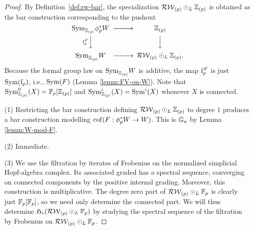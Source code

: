 \begin{proof}
By Definition~\ref{def:rw-bar}, the specialization $\mathcal{RW}_{(p)} \odot_L \mathbb{Z}_{(p)}$ is obtained as the bar construction corresponding to the pushout
\begin{equation*}
\begin{CD}
\Sym_{\Z_{(p)}} \phi_p^* W @>>> \Z_{(p)} \\
  @V\frob_p^FVV        @VVV \\
\Sym_{\Z_{(p)}} W @>>> \dRW_{(p)} \hotimes_L \Z_{(p)}.
\end{CD}
\end{equation*}
Because the formal group law on $\mathrm{Sym}_{\mathbb{Z}_{(p)}} W$ is additive, the map $\mathrm f_p^F$ is just $\mathrm{Sym}(\mathrm f_p)$, i.e., $\mathrm{Sym}(F)$ (Lemma \ref{lemm:FV-on-W}).
Note that $\mathrm{Sym}^0_{\mathbb{Z}_{(p)}}(X) = \mathbb{F}_p[\mathbb{Z}_{(p)}]$ and $\mathrm{Sym}^i_{\mathbb{Z}_{(p)}}(X) = \mathrm{Sym}^i(X)$ whenever $X$ is connected.

(1) Restricting the bar construction defining $\mathcal{RW}_{(p)} \odot_L \mathbb{Z}_{(p)}$ to degree $1$ produces a bar construction modelling $\operatorname{cof}(F: \phi_p^* W \to W)$.
This is ${\mathbb G}_a$ by Lemma \ref{lemm:W-mod-F}.

(2) Immediate.

(3)
We use the filtration by iterates of Frobenius on the normalized simplicial Hopf-algebra complex. Its associated graded has a spectral sequence, converging on connected components by the positive internal grading.
Moreover, this construction is multiplicative.
The degree zero part of $\mathcal{RW}_{(p)} \odot_L \mathbb{F}_p$ is clearly just $\mathbb{F}_p[\mathbb{F}_p]$, so we need only determine the connected part.
We will thus determine $\mathfrak H_*(\mathcal{RW}_{(p)} \odot_L \mathbb{F}_p)$ by studying the spectral sequence of the filtration by Frobenius on $\mathcal{RW}_{(p)} \odot_L \mathbb{F}_p$.


\end{proof}
